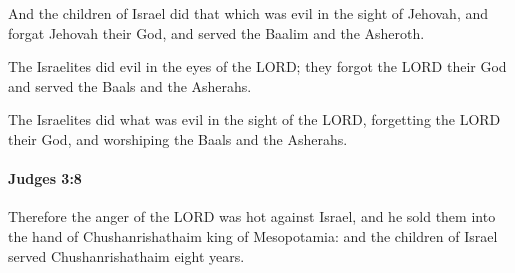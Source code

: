 			\begin{versebox}
					\item[BHS] 
					\item[ASV] And the children of Israel did that which was evil in the sight of Jehovah, and forgat Jehovah their God, and served the Baalim and the Asheroth.
					\item[NIV] The Israelites did evil in the eyes of the LORD; they forgot the LORD their God and served the Baals and the Asherahs.
					\item[NRSV] The Israelites did what was evil in the sight of the LORD, forgetting the LORD their God, and worshiping the Baals and the Asherahs.
			\end{versebox}

		\paragraph{Judges 3:8} %
			\label{JUDGES-3-8}

			Therefore the anger of the LORD was hot against Israel, and he sold them into the hand of Chushanrishathaim king of Mesopotamia: and the children of Israel served Chushanrishathaim eight years.

